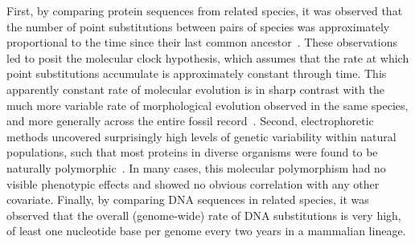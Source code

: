 First, by comparing protein sequences from related species, it was observed that the number of point substitutions between pairs of species was approximately proportional to the time since their last common ancestor~\citep{Zuckerkandl1965,Salser1976}.
These observations led to posit the molecular clock hypothesis, which assumes that the rate at which point substitutions accumulate is approximately constant through time.
This apparently constant rate of molecular evolution is in sharp contrast with the much more variable rate of morphological evolution observed in the same species, and more generally across the entire fossil record~\citep{Simpson1944,Simpson1953}.
Second, electrophoretic methods uncovered surprisingly high levels of genetic variability within natural populations, such that most proteins in diverse organisms were found to be naturally polymorphic~\citep{Harris1966, Hubby1966, Lewontin1966}.
In many cases, this molecular polymorphism had no visible phenotypic effects and showed no obvious correlation with any other covariate.
Finally, by comparing \acrshort{DNA} sequences in related species, it was observed that the overall (genome-wide) rate of \acrshort{DNA} substitutions is very high, of least one nucleotide base per genome every two years in a mammalian lineage.

